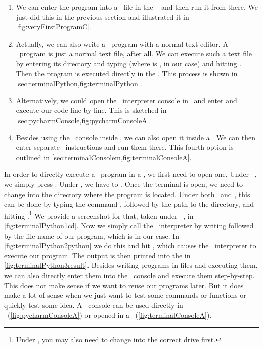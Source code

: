 \begin{enumerate}%
%
\item We can enter the program into a \python\ file in the \pycharm\  and then run it from there. %
We just did this in the previous section and illustrated it in \cref{fig:veryFirstProgramC}.%
%
\item Actually, we can also write a \python\ program with a normal text editor. %
A \python\ program is just a normal text file, after all. %
We can execute such a text file by entering its directory and typing  (where  is , in our case) and hitting \keys{\enter}. %
Then the program is executed directly in the . %
This process is shown in \cref{sec:terminalPython,fig:terminalPython}.%
%
\item Alternatively, we could open the \python\ interpreter console in \pycharm\ and enter and execute our code line-by-line. %
This is sketched in \cref{sec:pycharmConsole,fig:pycharmConsoleA}.%
%
\item Besides using the \python\ console inside \pycharm, we can also open it inside a . %
We can then enter separate \python\ instructions and run them there. %
This fourth option is outlined in \cref{sec:terminalConsolem,fig:terminalConsoleA}.%
%
\end{enumerate}%
%
%
\label{sec:terminalPython}%
In order to directly execute a \python\ program in a , we first need to open one.
Under \ubuntu\ \linux, we simply press \ubuntuTerminal.
Under \windows, we have to \windowsTerminal.
Once the terminal is open, we need to change into the directory where the program is located.
Under both \linux\ and \windows, this can be done by typing the command , followed by the path to the directory, and hitting \keys{\enter}.\footnote{%
Under \windows, you may also need to change into the correct drive first.}
We provide a screenshot for that, taken under \ubuntu\ \linux, in \cref{fig:terminalPython1cd}.
Now we simply call the \python\ interpreter by writing  followed by the file name of our program, which is  in our case.
In \cref{fig:terminalPython2python} we do this and hit \keys{\enter}, which causes the \python\ interpreter to execute our program.
The output  is then printed into the  in \cref{fig:terminalPython3result}.%
\endhsection%
%
%
\label{sec:pycharmConsole}%
Besides writing programs in files and executing them, we can also directly enter them into the \python\ console and execute them step-by-step.
This does not make sense if we want to reuse our programs later.
But it does make a lot of sense when we just want to test some commands or functions or quickly test some idea.
A \python\ console can be used directly in \pycharm~(\cref{fig:pycharmConsoleA}) or opened in a ~(\cref{fig:terminalConsoleA}).

